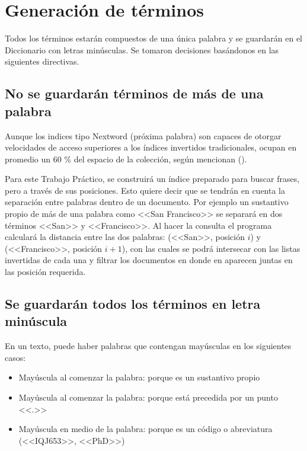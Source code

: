 
\section{Generación de términos}\label{sec:parser}
 
Todos los términos estarán compuestos de una única palabra y se guardarán en el Diccionario con letras minúsculas. Se tomaron decisiones basándonos en las siguientes directivas.


\subsection{No se guardarán términos de más de una palabra}

Aunque los indices tipo Nextword (próxima palabra) son capaces de otorgar velocidades de acceso superiores a los índices invertidos tradicionales, ocupan en promedio un 60 \% del espacio de la colección, según mencionan \citet{Williams99what'snext?} (\citeyear{Williams99what'snext?}). 

Para este Trabajo Práctico, se construirá un índice preparado para buscar frases, pero a través de sus posiciones. Esto quiere decir que se tendrán en cuenta la separación entre palabras dentro de un documento. Por ejemplo un sustantivo propio de más de una palabra como <<San Francisco>> se separará en dos términos <<San>> y <<Francisco>>. Al hacer la consulta el programa calculará la distancia entre las dos palabras: (<<San>>, posición $i$) y (<<Francisco>>, posición $i+1$), con las cuales se podrá intersecar con las listas invertidas de cada una y filtrar los documentos en donde en aparecen juntas en las posición requerida.


\subsection{Se guardarán todos los términos en letra minúscula}
En un texto, puede haber palabras que contengan mayúsculas en los siguientes casos:


\begin{itemize}
\item Mayúscula al comenzar la palabra: porque es un sustantivo propio
\item Mayúscula al comenzar la palabra: porque está precedida por un punto <<.>>
\item Mayúscula en medio de la palabra: porque es un código o abreviatura (<<IQJ653>>, <<PhD>>)
\end{itemize}

